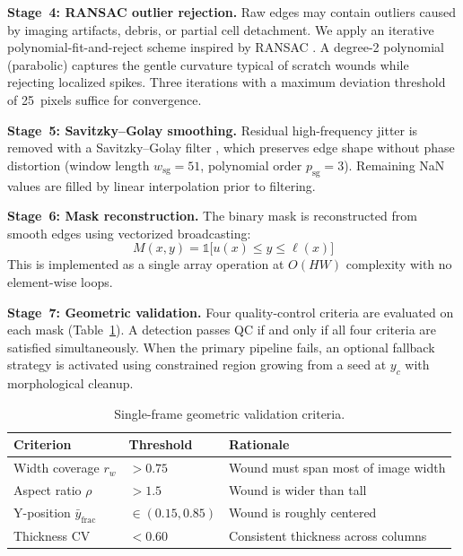 \textbf{Stage~4: RANSAC outlier rejection.}
Raw edges may contain outliers caused by imaging artifacts, debris, or partial cell detachment. We apply an iterative polynomial-fit-and-reject scheme inspired by RANSAC \citep{Fischler1981}. A degree-2 polynomial (parabolic) captures the gentle curvature typical of scratch wounds while rejecting localized spikes. Three iterations with a maximum deviation threshold of 25~pixels suffice for convergence.

\textbf{Stage~5: Savitzky--Golay smoothing.}
Residual high-frequency jitter is removed with a Savitzky--Golay filter \citep{Savitzky1964}, which preserves edge shape without phase distortion (window length $w_\text{sg} = 51$, polynomial order $p_\text{sg} = 3$). Remaining NaN values are filled by linear interpolation prior to filtering.

\textbf{Stage~6: Mask reconstruction.}
The binary mask is reconstructed from smooth edges using vectorized broadcasting:
\begin{equation}
  M(x, y) = \mathbb{1}\bigl[u(x) \leq y \leq \ell(x)\bigr]
\end{equation}
This is implemented as a single array operation at $O(HW)$ complexity with no element-wise loops.

\textbf{Stage~7: Geometric validation.}
Four quality-control criteria are evaluated on each mask (Table~\ref{tab:qc_criteria}). A detection passes QC if and only if all four criteria are satisfied simultaneously. When the primary pipeline fails, an optional fallback strategy is activated using constrained region growing from a seed at $y_c$ with morphological cleanup.

\begin{table}[t]
  \centering
  \caption{Single-frame geometric validation criteria.}\label{tab:qc_criteria}
  \begin{tabular}{llp{5cm}}
    \toprule
    Criterion & Threshold & Rationale \\
    \midrule
    Width coverage $r_w$ & $> 0.75$ & Wound must span most of image width \\
    Aspect ratio $\rho$ & $> 1.5$ & Wound is wider than tall \\
    Y-position $\bar{y}_\text{frac}$ & $\in (0.15, 0.85)$ & Wound is roughly centered \\
    Thickness CV & $< 0.60$ & Consistent thickness across columns \\
    \bottomrule
  \end{tabular}
\end{table}

